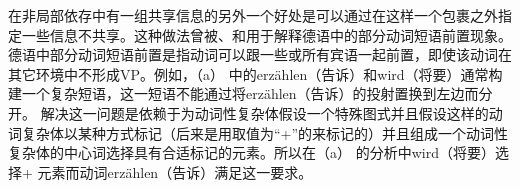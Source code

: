 在非局部依存中有一组共享信息的另外一个好处是可以通过在这样一个包裹之外指定一些信息不共享。这种做法曾被\citet{Hoehle94a}、\citet{Mueller96a,Mueller2002b}和\citet{Meurers99a}用于解释德语中的部分动词短语前置现象。德语中部分动词短语前置是指动词可以跟一些或所有宾语一起前置，即使该动词在其它环境中不形成VP。例如，（a） 中的erzählen（告诉）和wird（将要）通常构建一个复杂短语，这一短语不能通过将erzählen（告诉）的投射置换到左边而分开。
\eal
{}
\zl
\citet{HN94a}解决这一问题是依赖于为动词性复杂体假设一个特殊图式并且假设这样的动词复杂体以某种方式标记（后来是用取值为“+”的\lexfc 来标记的）并且组成一个动词性复杂体的中心词选择具有合适标记的元素。所以在（a） 的分析中wird（将要）选择\lexc+ 元素而动词erzählen（告诉）满足这一要求。

